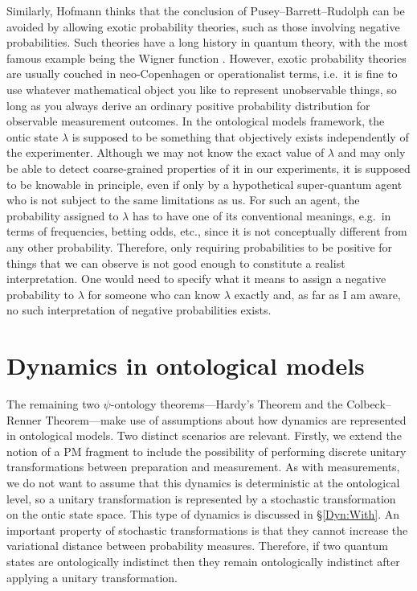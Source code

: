 \documentclass[DIV=calc,fontsize=12pt]{scrartcl} %
\theoremstyle{definition}
\theoremstyle{plain}
\begin{document}
Similarly, Hofmann \cite{Hofmann2011} thinks that the conclusion of
Pusey--Barrett--Rudolph can be avoided by allowing exotic probability theories, such as
those involving negative probabilities.  Such theories have a long
history in quantum theory, with the most famous example being the
Wigner function \cite{Wigner1932}.  However, exotic probability
theories are usually couched in neo-Copenhagen or operationalist
terms, i.e.\ it is fine to use whatever mathematical object you like
to represent unobservable things, so long as you always derive an
ordinary positive probability distribution for observable measurement
outcomes.  In the ontological models framework, the ontic state
$\lambda$ is supposed to be something that objectively exists
independently of the experimenter.  Although we may not know the exact
value of $\lambda$ and may only be able to detect coarse-grained
properties of it in our experiments, it is supposed to be knowable in
principle, even if only by a hypothetical super-quantum agent who is
not subject to the same limitations as us.  For such an agent, the
probability assigned to $\lambda$ has to have one of its conventional
meanings, e.g.\ in terms of frequencies, betting odds, etc., since it
is not conceptually different from any other probability.  Therefore,
only requiring probabilities to be positive for things that we can
observe is not good enough to constitute a realist interpretation.
One would need to specify what it means to assign a negative
probability to $\lambda$ for someone who can know $\lambda$ exactly
and, as far as I am aware, no such interpretation of negative
probabilities exists.

\section{Dynamics in ontological models}

\label{Dyn}

The remaining two $\psi$-ontology theorems---Hardy's Theorem and the
Colbeck--Renner Theorem---make use of assumptions about how dynamics
are represented in ontological models.  Two distinct scenarios are
relevant.  Firstly, we extend the notion of a PM fragment to include
the possibility of performing discrete unitary transformations between
preparation and measurement.  As with measurements, we do not want to
assume that this dynamics is deterministic at the ontological level,
so a unitary transformation is represented by a stochastic
transformation on the ontic state space.  This type of dynamics is
discussed in \S\ref{Dyn:With}.  An important property of stochastic
transformations is that they cannot increase the variational distance
between probability measures.  Therefore, if two quantum states are
ontologically indistinct then they remain ontologically indistinct
after applying a unitary transformation.
\end{document}
